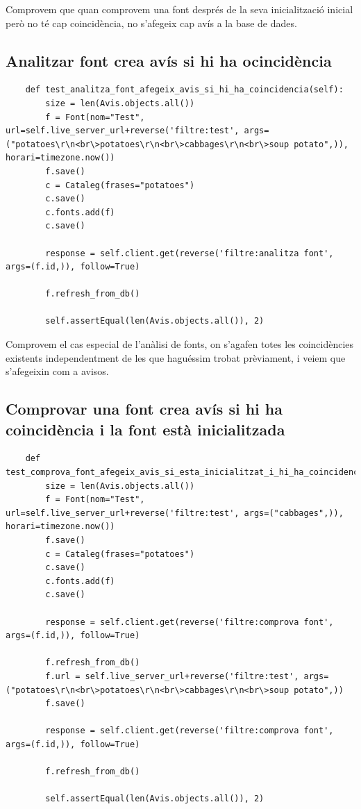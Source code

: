 \documentclass{article}
\begin{document}
Comprovem que quan comprovem una font després de la seva inicialització inicial però no té cap coincidència, no s'afegeix cap avís a la base de dades.

\subsection{Analitzar font crea avís si hi ha ocincidència}

\begin{lstlisting}
    def test_analitza_font_afegeix_avis_si_hi_ha_coincidencia(self):
        size = len(Avis.objects.all())
        f = Font(nom="Test", url=self.live_server_url+reverse('filtre:test', args=("potatoes\r\n<br\>potatoes\r\n<br\>cabbages\r\n<br\>soup potato",)), horari=timezone.now())
        f.save()
        c = Cataleg(frases="potatoes")
        c.save()
        c.fonts.add(f)
        c.save()

        response = self.client.get(reverse('filtre:analitza font', args=(f.id,)), follow=True)

        f.refresh_from_db()

        self.assertEqual(len(Avis.objects.all()), 2)
\end{lstlisting}

Comprovem el cas especial de l'anàlisi de fonts, on s'agafen totes les coincidències existents independentment de les que haguéssim trobat prèviament, i veiem que s'afegeixin com a avisos.

\subsection{Comprovar una font crea avís si hi ha coincidència i la font està inicialitzada}

\begin{lstlisting}
    def test_comprova_font_afegeix_avis_si_esta_inicialitzat_i_hi_ha_coincidencia(self):
        size = len(Avis.objects.all())
        f = Font(nom="Test", url=self.live_server_url+reverse('filtre:test', args=("cabbages",)), horari=timezone.now())
        f.save()
        c = Cataleg(frases="potatoes")
        c.save()
        c.fonts.add(f)
        c.save()

        response = self.client.get(reverse('filtre:comprova font', args=(f.id,)), follow=True)

        f.refresh_from_db()
        f.url = self.live_server_url+reverse('filtre:test', args=("potatoes\r\n<br\>potatoes\r\n<br\>cabbages\r\n<br\>soup potato",))
        f.save()

        response = self.client.get(reverse('filtre:comprova font', args=(f.id,)), follow=True)

        f.refresh_from_db()

        self.assertEqual(len(Avis.objects.all()), 2)
\end{lstlisting}
\end{document}
